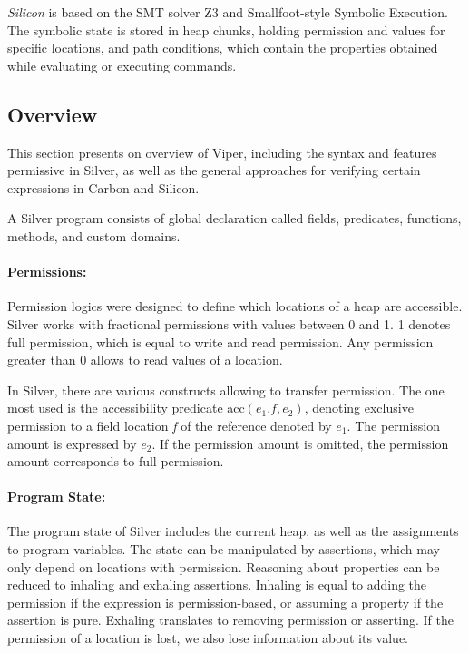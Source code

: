 \documentclass[12pt]{article}
\begin{document}
\textit{Silicon} is based on the SMT solver Z3\cite{de2008z3} and Smallfoot-style Symbolic Execution\cite{berdine2005smallfoot}. The symbolic state is stored in heap chunks, holding permission and values for specific locations, and path conditions, which contain the properties obtained while evaluating or executing commands.

\subsection{Overview}
This section presents on overview of Viper\cite{viper}\cite{viper2014}, including the syntax and features permissive in Silver, as well as the general approaches for verifying certain expressions in Carbon and Silicon.

A Silver program consists of global declaration called fields, predicates, functions, methods, and custom domains.

\paragraph{Permissions: }
Permission logics were designed to define which locations of a heap are accessible. Silver works with fractional permissions with values between 0 and 1. 1 denotes full permission, which is equal to write and read permission. Any permission greater than 0 allows to read values of a location. 

In Silver, there are various constructs allowing to transfer permission. The one most used is the accessibility predicate acc\((e_1.f, e_2)\), denoting exclusive permission to a field location \textit{f} of the reference denoted by \(e_1\). The permission amount is expressed by \(e_2\). If the permission amount is omitted, the permission amount corresponds to full permission.

\paragraph{Program State: }
The program state of Silver includes the current heap, as well as the assignments to program variables. The state can be manipulated by assertions, which may only depend on locations with permission. Reasoning about properties can be reduced to inhaling and exhaling assertions. Inhaling is equal to adding the permission if the expression is permission-based, or assuming a property if the assertion is pure. Exhaling translates to removing permission or asserting. If the permission of a location is lost, we also lose information about its value.
\end{document}
